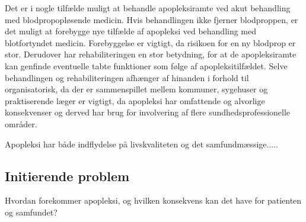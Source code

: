 Det er i nogle tilfælde muligt at behandle apopleksiramte ved akut behandling med blodpropopløsende medicin. Hvis behandlingen ikke fjerner blodproppen, er det muligt at forebygge nye tilfælde af apopleksi ved behandling med blotfortyndet medicin. Forebyggelse er vigtigt, da risikoen for en ny blodprop er stor. Derudover har rehabiliteringen en stor betydning, for at de apopleksiramte kan genfinde eventuelle tabte funktioner som følge af apopleksitilfældet. Selve behandlingen og rehabiliteringen afhænger af hinanden i forhold til organisatorisk, da der er sammenspillet mellem kommuner, sygehuser og praktiserende læger er vigtigt, da apopleksi har omfattende og alvorlige konsekvenser og derved har brug for involvering af flere sundhedsprofessionelle områder.

Apopleksi har både indflydelse på livskvaliteten og det samfundmæssige.....




\subsection{Initierende problem}
Hvordan forekommer apopleksi, og hvilken konsekvens kan det have for patienten og samfundet?